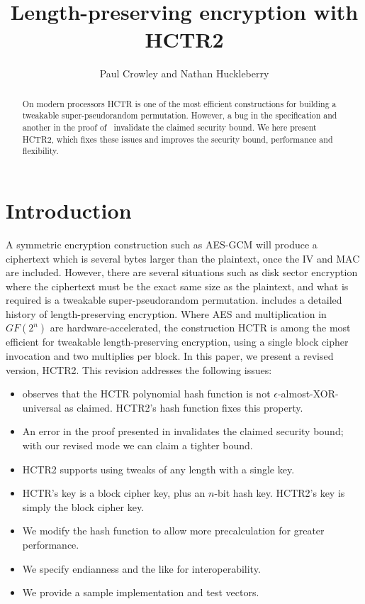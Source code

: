 \documentclass[letterpaper,11pt]{article}
\title{Length-preserving encryption with HCTR2}
\author{Paul Crowley and Nathan Huckleberry}
\begin{document}
\maketitle

\begin{abstract}
On modern processors HCTR\cite{hctr} is
one of the most efficient constructions
for building a tweakable super-pseudorandom permutation. However,
a bug in the specification and another in the proof of~\cite{hctrquad}
invalidate the claimed security bound. We here present HCTR2,
which fixes these issues and improves the
security bound, performance and flexibility.
\end{abstract}

\section{Introduction}
A symmetric encryption construction such as AES-GCM\cite{gcm}
will produce a ciphertext which is several bytes larger than
the plaintext, once the IV and MAC are included. However,
there are several situations such as disk sector encryption
where the ciphertext must be the exact same size as the
plaintext, and what is required is a tweakable
super-pseudorandom permutation\cite{cmc}. 
\cite{adiantum} includes a detailed history of length-preserving encryption.
Where AES and multiplication in \(GF(2^n)\) are hardware-accelerated,
the construction HCTR\cite{hctr} is among the most efficient for 
tweakable length-preserving encryption, using
a single block cipher invocation and two multiplies
per block. In this paper, we present a revised version, HCTR2.
This revision addresses the following issues:
\begin{itemize}
    \item \cite{kumarhctr} observes that the HCTR polynomial hash function
    is not \(\epsilon\)-almost-XOR-universal\cite{eadu} as claimed.
    HCTR2's hash function fixes this property.
    \item An error in the proof presented in \cite{hctrquad}
    invalidates the claimed security bound; with our revised
    mode we can claim a tighter bound.
    \item HCTR2 supports using tweaks of any length with a single key.
    \item HCTR's key is a block cipher key, plus an \(n\)-bit
    hash key. HCTR2's key is simply
    the block cipher key.
    \item We modify the hash function to allow more precalculation
    for greater performance.
    \item We specify endianness and the like for interoperability.
    \item We provide a sample implementation and test vectors.
\end{itemize}
\end{document}
